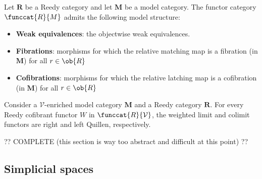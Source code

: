     \begin{property}
        Let $\mathbf{R}$ be a Reedy category and let $\mathbf{M}$ be a model category. The functor category $\funccat{R}{M}$ admits the following model structure:
        \begin{itemize}
            \item\textbf{Weak equivalences}: the objectwise weak equivalences.
            \item\textbf{Fibrations}: morphisms for which the relative matching map is a fibration (in $\mathbf{M}$) for all $r\in\ob{R}$
            \item\textbf{Cofibrations}: morphisms for which the relative latching map is a cofibration (in $\mathbf{M}$) for all $r\in\ob{R}$
        \end{itemize}
    \end{property}

    \begin{property}
        Consider a $\mathcal{V}$-enriched model category $\mathbf{M}$ and a Reedy category $\mathbf{R}$. For every Reedy cofibrant functor $W$ in $\funccat{R}{\mathcal{V}}$, the weighted limit and colimit functors are right and left Quillen, respectively.
    \end{property}

    ?? COMPLETE (this section is way too abstract and difficult at this point) ??

\subsection{Simplicial spaces}

